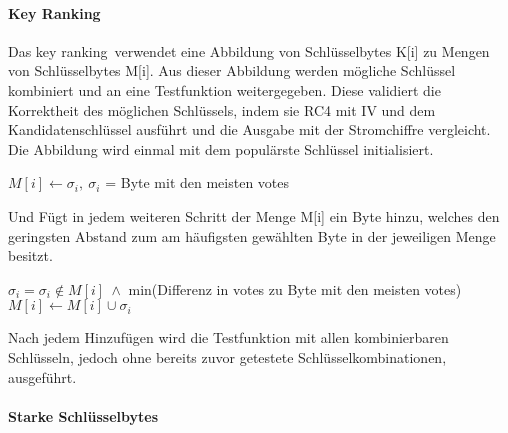 \documentclass[10pt,a4paper]{article}
\begin{document}
\paragraph{Key Ranking}
Das \glqq key ranking\grqq\ verwendet eine Abbildung von Schlüsselbytes K[i] zu Mengen von Schlüsselbytes M[i]. Aus dieser Abbildung werden mögliche Schlüssel kombiniert und an eine Testfunktion weitergegeben. Diese validiert die Korrektheit des möglichen Schlüssels, indem sie RC4 mit IV und dem Kandidatenschlüssel ausführt und die Ausgabe mit der Stromchiffre vergleicht.\\
Die Abbildung wird einmal mit dem populärste Schlüssel initialisiert.
\begin{center}
$ M[i] \leftarrow \sigma_i,\ \sigma_i$ = Byte mit den meisten votes
\end{center}
Und Fügt in jedem weiteren Schritt der Menge M[i] ein Byte hinzu, welches den geringsten Abstand zum am häufigsten gewählten Byte in der jeweiligen Menge besitzt.
\begin{center}
$\sigma_i = \sigma_i \notin M[i]\ \wedge$ min(Differenz in votes zu Byte mit den meisten votes)
\\\vspace{0.8em}
$ M[i] \leftarrow M[i] \cup \sigma_i$
\end{center}
Nach jedem Hinzufügen wird die Testfunktion mit allen kombinierbaren Schlüsseln, jedoch ohne bereits zuvor getestete Schlüsselkombinationen, ausgeführt. 
\paragraph{Starke Schlüsselbytes}
\end{document}
